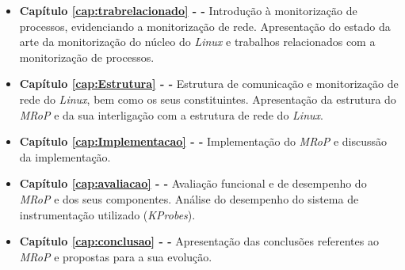 \begin{itemize}
	\item \textbf{Capítulo \ref{cap:trabrelacionado} -  - } Introdução à monitorização de processos, evidenciando a monitorização de rede. Apresentação do estado da arte da monitorização do núcleo do \textit{Linux} e trabalhos relacionados com a monitorização de processos.

	\item \textbf{Capítulo \ref{cap:Estrutura} -   - } Estrutura de comunicação e monitorização de rede do \textit{Linux}, bem como os seus constituintes. Apresentação da estrutura do \textit{MRoP} e da sua interligação com a estrutura de rede do \textit{Linux}.

	\item \textbf{Capítulo \ref{cap:Implementacao} -  - } Implementação do \textit{MRoP} e discussão da implementação.

	\item \textbf{Capítulo \ref{cap:avaliacao} -  - } Avaliação funcional e de desempenho do \textit{MRoP} e dos seus componentes. Análise do desempenho do sistema de instrumentação utilizado (\textit{KProbes}).

	\item \textbf{Capítulo \ref{cap:conclusao} -  - } Apresentação das conclusões referentes ao \textit{MRoP} e propostas para a sua evolução.

\end{itemize}
